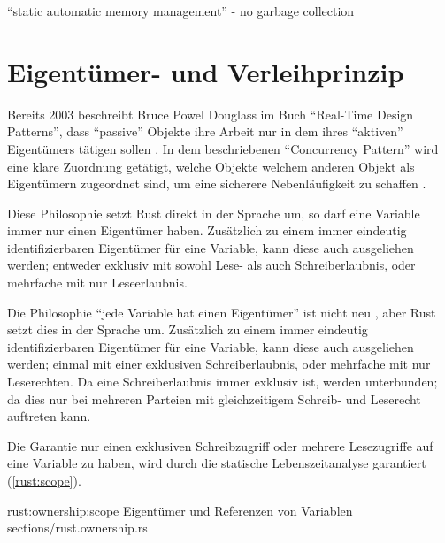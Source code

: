 \enquote{static automatic memory management} - no garbage collection \cite{rust:youtube:goto2017}
 \\



\section{Eigentümer- und Verleihprinzip}
\label{rust:ownership}

Bereits 2003 beschreibt Bruce Powel Douglass im Buch \enquote{Real-Time Design Patterns}, dass \enquote{passive} Objekte ihre Arbeit nur in dem  ihres \enquote{aktiven} Eigentümers tätigen sollen \cite[204]{douglass2003real}.
In dem beschriebenen \enquote{Concurrency Pattern} wird eine klare Zuordnung getätigt, welche Objekte welchem anderen Objekt als Eigentümern zugeordnet sind, um eine sicherere Nebenläufigkeit zu schaffen .

Diese Philosophie setzt Rust direkt in der Sprache um, so darf eine Variable immer nur einen Eigentümer haben. Zusätzlich zu einem immer eindeutig identifizierbaren Eigentümer für eine Variable, kann diese auch ausgeliehen werden; entweder exklusiv mit sowohl Lese- als auch Schreiberlaubnis, oder mehrfache mit nur Leseerlaubnis.

Die Philosophie \enquote{jede Variable hat einen Eigentümer} ist nicht neu 
 , aber Rust setzt dies in der Sprache um.
Zusätzlich zu einem immer eindeutig identifizierbaren Eigentümer für eine Variable, kann diese auch ausgeliehen werden; einmal mit einer exklusiven Schreiberlaubnis, oder mehrfache mit nur Leserechten.
Da eine Schreiberlaubnis immer exklusiv ist, werden  unterbunden; da dies nur bei mehreren Parteien mit gleichzeitigem Schreib- und Leserecht auftreten kann.

Die Garantie nur einen exklusiven Schreibzugriff oder mehrere Lesezugriffe auf eine Variable zu haben, wird durch die statische Lebenszeitanalyse garantiert (\autoref{rust:scope}).

\rustcinclude
	{rust:ownership:scope}
	{Eigentümer und Referenzen von Variablen}
	{sections/rust.ownership.rs}



